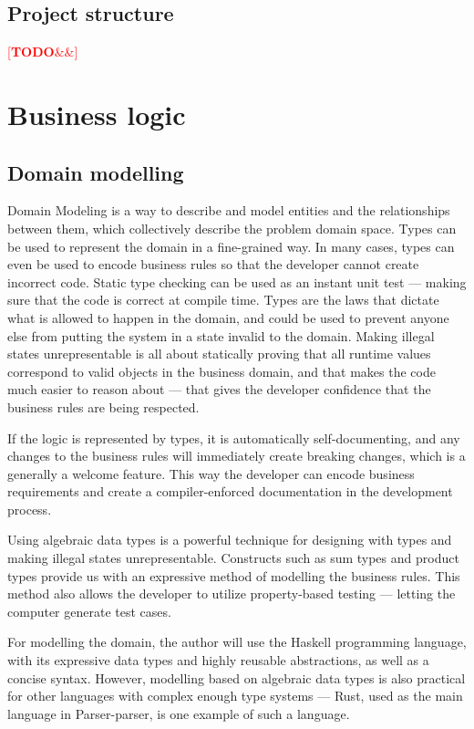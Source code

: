 \documentclass[english,engineering]{wizthesis}
\newcommand{\todo}[1]{%
  \textcolor{red}{[\textbf{TODO}\ifx&#1&{}\else{ }\fi\emph{#1}]}%
}
\newcommand{\paraphrase}[1]{#1}
\newcommand{\thisproject}{Parser-parser}
\begin{document}
\subsection{Project structure}

\todo{}

\section{Business logic}

\subsection{Domain modelling} \label{sbs:domain-modelling}

\paraphrase{Domain Modeling is a way to describe and model entities and the
relationships between them, which collectively describe the problem domain
space. Types can be used to represent the domain in a fine-grained way. In many
cases, types can even be used to encode business rules so that the developer
cannot create incorrect code. Static type checking can be used as an instant
unit test --- making sure that the code is correct at compile time. Types are
the laws that dictate what is allowed to happen in the domain, and could be used
to prevent anyone else from putting the system in a state invalid to the domain.
Making illegal states unrepresentable is all about statically proving that all
runtime values correspond to valid objects in the business domain, and that
makes the code much easier to reason about --- that gives the developer
confidence that the business rules are being respected.}

\paraphrase{If the logic is represented by types, it is automatically
self-documenting, and any changes to the business rules will immediately create
breaking changes, which is a generally a welcome feature. This way the developer
can encode business requirements and create a compiler-enforced documentation in
the development process.}

Using algebraic data types is a powerful technique for designing with types and
making illegal states unrepresentable. Constructs such as sum types and product
types provide us with an expressive method of modelling the business rules.
This method also allows the developer to utilize property-based testing ---
letting the computer generate test cases.

For modelling the domain, the author will use the Haskell programming language,
with its expressive data types and highly reusable abstractions, as well as a
concise syntax. However, modelling based on algebraic data types is also
practical for other languages with complex enough type systems --- Rust, used as
the main language in \thisproject{}, is one example of such a language.
\end{document}
